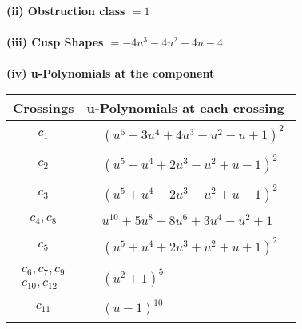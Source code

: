 \documentclass[1p]{elsarticle_modified}
\theoremstyle{definition}
\begin{document}
\flushleft \textbf{(ii) Obstruction class $= 1$}\\~\\
\flushleft \textbf{(iii) Cusp Shapes $= -4 u^3-4 u^2-4 u-4$}\\~\\
\newpage\renewcommand{\arraystretch}{1}
\flushleft \textbf{(iv) u-Polynomials at the component}\newline \\
\begin{tabular}{m{50pt}|m{274pt}}
Crossings & \hspace{64pt}u-Polynomials at each crossing \\
\hline $$\begin{aligned}c_{1}\end{aligned}$$&$\begin{aligned}
&(u^5-3 u^4+4 u^3- u^2- u+1)^2
\end{aligned}$\\
\hline $$\begin{aligned}c_{2}\end{aligned}$$&$\begin{aligned}
&(u^5- u^4+2 u^3- u^2+u-1)^2
\end{aligned}$\\
\hline $$\begin{aligned}c_{3}\end{aligned}$$&$\begin{aligned}
&(u^5+u^4-2 u^3- u^2+u-1)^2
\end{aligned}$\\
\hline $$\begin{aligned}c_{4},c_{8}\end{aligned}$$&$\begin{aligned}
&u^{10}+5 u^8+8 u^6+3 u^4- u^2+1
\end{aligned}$\\
\hline $$\begin{aligned}c_{5}\end{aligned}$$&$\begin{aligned}
&(u^5+u^4+2 u^3+u^2+u+1)^2
\end{aligned}$\\
\hline $$\begin{aligned}c_{6},c_{7},c_{9}\\c_{10},c_{12}\end{aligned}$$&$\begin{aligned}
&(u^2+1)^5
\end{aligned}$\\
\hline $$\begin{aligned}c_{11}\end{aligned}$$&$\begin{aligned}
&(u-1)^{10}
\end{aligned}$\\
\hline
\end{tabular}\\~\\
\end{document}
